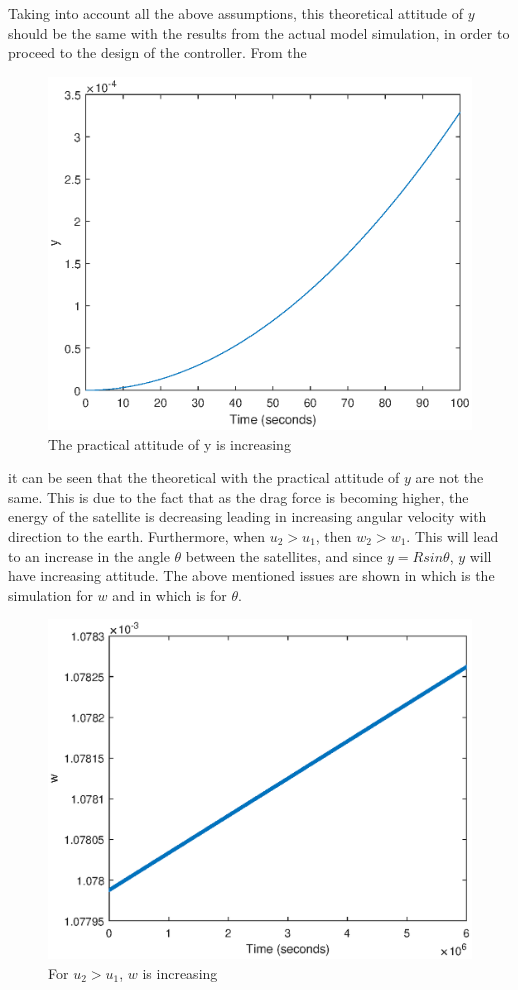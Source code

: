 % 
Taking into account all the above assumptions, this theoretical attitude of $y$ should be the same with the results from the actual model simulation, in order to proceed to the design of the controller. From the  
%  
\begin{figure}[H]
	\centering
	\includegraphics[width=0.6\linewidth]
	{figures/practiceapprox.eps}
	\caption{The practical attitude of y is increasing }
	\label{fig:practiceapprox}
\end{figure}
% 
it can be seen that the theoretical with the practical attitude of $y$  are not the same. This is due to the fact that as the drag force is becoming higher, the energy of the satellite is decreasing leading in increasing angular velocity with direction to the earth. Furthermore, when $u_2 > u_1$, then $w_2 > w_1$. This will lead to an increase in the angle $\theta$ between the satellites, and since $y = Rsin\theta$, $y$ will have increasing attitude. The above mentioned issues are shown in  which is the simulation for $w$ and in   which is for $\theta$.    
%
\begin{figure}[H]
	\centering
	\includegraphics[width=0.6\linewidth]
	{figures/nonomega.eps}
	\caption{For $u_2 >u_1$, $w$ is increasing  }
	\label{fig:inomega}
\end{figure}
